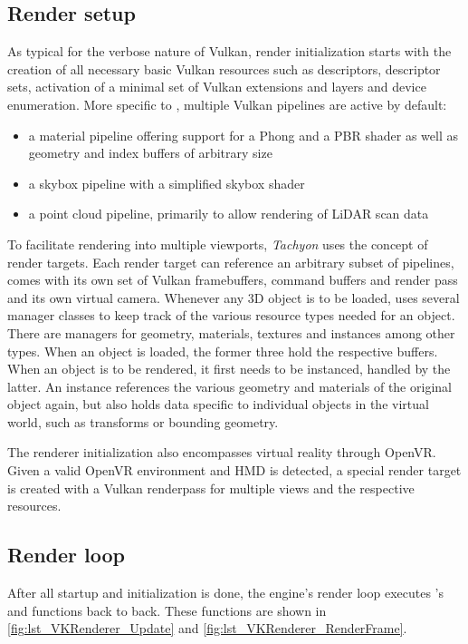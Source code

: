 \subsection{Render setup} 
As typical for the verbose nature of Vulkan, render initialization starts with the creation of all necessary basic Vulkan resources such as descriptors, descriptor sets, activation of a minimal set of Vulkan extensions and layers and device enumeration. 
More specific to , multiple Vulkan pipelines are active by default:
\begin{itemize}
\item a material pipeline offering support for a Phong and a PBR shader as well as geometry and index buffers of arbitrary size
\item a skybox pipeline with a simplified skybox shader
\item a point cloud pipeline, primarily to allow rendering of LiDAR scan data
\end{itemize}
To facilitate rendering into multiple viewports, \textit{Tachyon} uses the concept of render targets. Each render target can reference an arbitrary subset of pipelines, comes with its own set of Vulkan framebuffers, command buffers and render pass and its own virtual camera. 
Whenever any 3D object is to be loaded,  uses several manager classes to keep track of the various resource types needed for an object. There are managers for geometry, materials, textures and instances among other types. When an object is loaded, the former three hold the respective buffers. When an object is to be rendered, it first needs to be instanced, handled by the latter. An instance references the various geometry and materials of the original object again, but also holds data specific to individual objects in the virtual world, such as transforms or bounding geometry. 

The renderer initialization also encompasses virtual reality through OpenVR. Given a valid OpenVR environment and HMD is detected, a special render target is created with a Vulkan renderpass for multiple views and the respective resources. 

\subsection{Render loop} 
After all startup and initialization is done, the engine's render loop executes 's  and  functions back to back. These functions are shown in \autoref{fig:lst_VKRenderer_Update} and \autoref{fig:lst_VKRenderer_RenderFrame}. 


